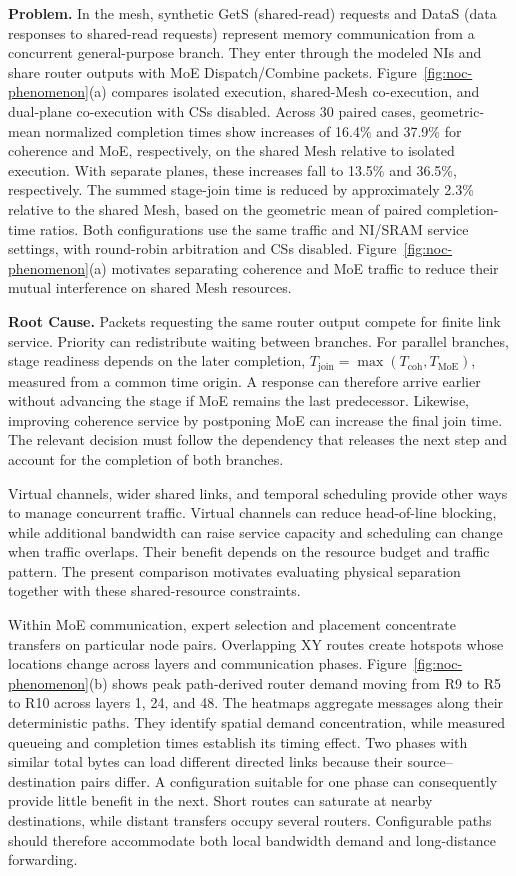 \documentclass[conference,10pt]{IEEEtran}
\begin{document}
\noindent\textbf{Problem.}
In the mesh, synthetic GetS (shared-read) requests and DataS
(data responses to shared-read requests) represent memory communication
from a concurrent general-purpose branch.
They enter through the modeled NIs and share router outputs with MoE
Dispatch/Combine packets. Figure~\ref{fig:noc-phenomenon}(a) compares
isolated execution, shared-Mesh co-execution, and dual-plane co-execution
with CSs disabled. Across 30 paired cases, geometric-mean normalized
completion times show increases of 16.4\% and 37.9\% for coherence and
MoE, respectively, on the shared Mesh relative to isolated execution.
With separate planes, these increases fall to 13.5\% and 36.5\%,
respectively. The summed stage-join time is reduced by approximately
2.3\% relative to the shared Mesh, based on the geometric mean of
paired completion-time ratios. Both configurations use the same traffic and NI/SRAM
service settings, with round-robin arbitration and CSs disabled.
Figure~\ref{fig:noc-phenomenon}(a) motivates separating coherence and MoE
traffic to reduce their mutual interference on shared Mesh resources.

\noindent\textbf{Root Cause.}
Packets requesting the same router output compete for finite link service.
Priority can redistribute waiting between branches. 
For parallel branches, stage readiness depends on the later completion,
$T_{\mathrm{join}}=\max(T_{\mathrm{coh}},T_{\mathrm{MoE}})$, measured
from a common time origin.
A response can therefore arrive earlier without advancing the stage if
MoE remains the last predecessor. Likewise, improving coherence service
by postponing MoE can increase the final join time. The relevant decision
must follow the dependency that releases the next step and account for
the completion of both branches.

Virtual channels, wider shared links, and temporal scheduling provide
other ways to manage concurrent traffic. Virtual channels can reduce
head-of-line blocking, while additional bandwidth can raise service
capacity and scheduling can change when traffic overlaps. Their benefit
depends on the resource budget and traffic pattern. The present
comparison motivates evaluating physical separation together with these
shared-resource constraints.

Within MoE communication, expert selection and placement concentrate
transfers on particular node pairs. Overlapping XY routes create hotspots
whose locations change across layers and communication phases.
Figure~\ref{fig:noc-phenomenon}(b) shows peak path-derived router demand
moving from R9 to R5 to R10 across layers 1, 24, and 48.
The heatmaps aggregate messages along their deterministic paths.
They identify spatial demand concentration, while measured queueing
and completion times establish its timing effect. Two phases with
similar total bytes can load different directed links because their
source--destination pairs differ. A configuration suitable for one
phase can consequently provide little benefit in the next.
Short routes can saturate at nearby destinations, while distant transfers
occupy several routers. Configurable paths should therefore accommodate
both local bandwidth demand and long-distance forwarding.
\end{document}
